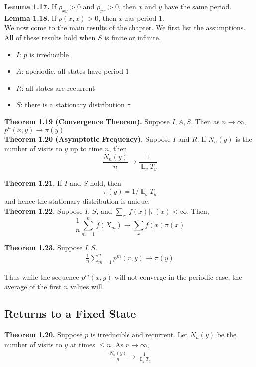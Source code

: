 \documentclass[12pt]{article}
\DeclareMathOperator*{\E}{\mathbb{E}}
\begin{document}
\textbf{Lemma 1.17.} If $\rho_{xy} > 0$ and $\rho_{yx} > 0$, then $x$ and $y$ have the same period.\\

\textbf{Lemma 1.18.} If $p(x, x) > 0$, then $x$ has period $1$.\\

We now come to the main results of the chapter. We first list the assumptions. All of these results hold when $S$ is finite or infinite.
\begin{itemize}
\item $I$: $p$ is irreducible
\item $A$: aperiodic, all states have period $1$
\item $R$: all states are recurrent
\item $S$: there is a stationary distribution $\pi$
\end{itemize}

\textbf{Theorem 1.19 (Convergence Theorem).} Suppose $I, A, S$. Then as $n \to \infty$, $p^n(x, y) \to \pi(y)$\\

\textbf{Theorem 1.20 (Asymptotic Frequency).} Suppose $I$ and $R$. If $N_n(y)$ is the number of visits to $y$ up to time $n$, then $$\frac{N_n(y)}{n} \to \frac{1}{\E_y T_y}$$

\textbf{Theorem 1.21.} If $I$ and $S$ hold, then $$\pi(y) = 1/\E_y T_y$$ and hence the stationary distribution is unique.\\

\textbf{Theorem 1.22.} Suppose $I$, $S$, and $\sum_x |f(x)|\pi(x) < \infty$. Then, $$\frac{1}{n} \sum_{m=1}^nf(X_m) \to \sum_x f(x) \pi(x)$$

\textbf{Theorem 1.23.} Suppose $I, S$.
\begin{align*}
\frac{1}{n} \sum_{m=1}^n p^m(x, y) \to \pi(y)
\end{align*}

Thus while the sequence $p^m(x,y)$ will not converge in the periodic case, the average of the first $n$ values will.



\subsection{Returns to a Fixed State}

\textbf{Theorem 1.20.} Suppose $p$ is irreducible and recurrent. Let $N_n(y)$ be the number of visits to $y$ at times $\leq n$. As $n \to \infty$,
\begin{align*}
\frac{N_n(y)}{n} \to \frac{1}{\E_y T_y}
\end{align*}
\end{document}
